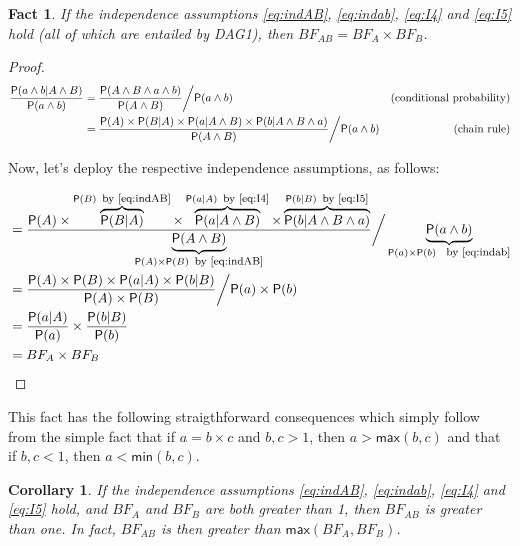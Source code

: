 \documentclass[
  10pt,
  dvipsnames,enabledeprecatedfontcommands]{scrartcl}
\newtheorem{fact}{Fact}
\newcommand{\et}{\wedge}
\newcommand{\pr}[1]{\ensuremath{\mathsf{P}(#1)}}
\newtheorem{corollary}{Corollary}[fact]
\begin{document}
\begin{fact} If the independence assumptions \eqref{eq:indAB}, \eqref{eq:indab}, \eqref{eq:I4} and \eqref{eq:I5} hold (all of which are entailed by \textsf{DAG1}), then 
$BF_{AB} = BF_A \times BF_B$. \label{fac:BFindep}
\end{fact}

\begin{proof}

\begin{align*}
\frac{\pr{a \wedge b\vert A\wedge B}}{\pr{a \wedge b}} & = \frac{\pr{A \et B\et a\wedge b}}{\pr{A \et B}} \bigg/ \pr{a \wedge b}
&\mbox{(conditional probability)} \\
&  = \frac{\pr{A} \times \pr {B \vert A}  \times \pr{a \vert A \et B} \times \pr{b \vert A \et B \et a}}{\pr{A \et B}} \bigg/ \pr{a \wedge b}
&\mbox{\,\,\,\,\,\,\, (chain rule)} \\
\end{align*}

\noindent Now, let's deploy the respective independence assumptions, as follows:

\begin{align*}
&  = \frac{\pr{A} \times \overbrace{\pr {B \vert A}}^{ \pr{B} \mbox{\footnotesize \, by \eqref{eq:indAB}}}  \times
\overbrace{\pr{a \vert A \et B}}^{\pr{a \vert A} \mbox{\footnotesize \, by \eqref{eq:I4}}}
\times \overbrace{\pr{b \vert A \et B \et a}}^{\pr{b \vert B} \mbox{\footnotesize \, by \eqref{eq:I5}}}
}{\underbrace{\pr{A \et B}}_{\pr{A} \times \pr{B} \mbox{\footnotesize \, by \eqref{eq:indAB}}}} \bigg/ \underbrace{\pr{a \wedge b}}_{\pr{a}\times \pr{b} \mbox{ \footnotesize \, by \eqref{eq:indab}}} \\
&  = \frac{\pr{A} \times  \pr{B}   \times \pr{a \vert A}  \times  \pr{b \vert B}}
{\pr{A} \times \pr{B}} \bigg/ \pr{a}\times \pr{b} \\
& = \frac{\pr{a \vert A}  }{\pr{a}}  \times \frac{\pr{b \vert B}}{\pr{b}} \\
& = BF_{A} \times BF_B
\end{align*}

\end{proof}

This fact has the following straigthforward consequences which simply
follow from the simple fact that if \(a = b \times c\) and \(b, c>1\),
then \(a > \mathsf{max}(b,c)\) and that if \(b, c<1\), then
\(a < \mathsf{min}(b,c)\).

\begin{corollary} If the independence assumptions \eqref{eq:indAB}, \eqref{eq:indab}, \eqref{eq:I4} and \eqref{eq:I5} hold, and $BF_{A}$ and $BF_{B}$ are both greater than 1, then $BF_{AB}$ is greater than one. In fact,  $BF_{AB}$ is then greater than  $\mathsf{max}(BF_{A},BF_{B})$. \label{cor:BFind2}
\end{corollary}
\end{document}
